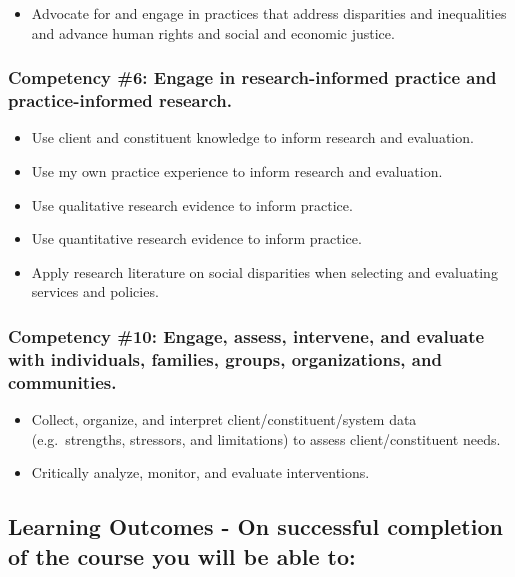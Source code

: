 \documentclass[11pt,]{article}
\providecommand{\tightlist}{%
  \setlength{\itemsep}{0pt}\setlength{\parskip}{0pt}}
\begin{document}
\begin{itemize}
\tightlist
\item
  Advocate for and engage in practices that address disparities and
  inequalities and advance human rights and social and economic justice.
\end{itemize}

\subsubsection{Competency \#6: Engage in research-informed practice and
practice-informed
research.}\label{competency-6-engage-in-research-informed-practice-and-practice-informed-research.}

\begin{itemize}
\tightlist
\item
  Use client and constituent knowledge to inform research and
  evaluation.
\item
  Use my own practice experience to inform research and evaluation.
\item
  Use qualitative research evidence to inform practice.
\item
  Use quantitative research evidence to inform practice.
\item
  Apply research literature on social disparities when selecting and
  evaluating services and policies.
\end{itemize}

\subsubsection{Competency \#10: Engage, assess, intervene, and evaluate
with individuals, families, groups, organizations, and
communities.}\label{competency-10-engage-assess-intervene-and-evaluate-with-individuals-families-groups-organizations-and-communities.}

\begin{itemize}
\tightlist
\item
  Collect, organize, and interpret client/constituent/system data
  (e.g.~strengths, stressors, and limitations) to assess
  client/constituent needs.
\item
  Critically analyze, monitor, and evaluate interventions.
\end{itemize}

\subsection{Learning Outcomes - On successful completion of the course
you will be able
to:}\label{learning-outcomes---on-successful-completion-of-the-course-you-will-be-able-to}
\end{document}
